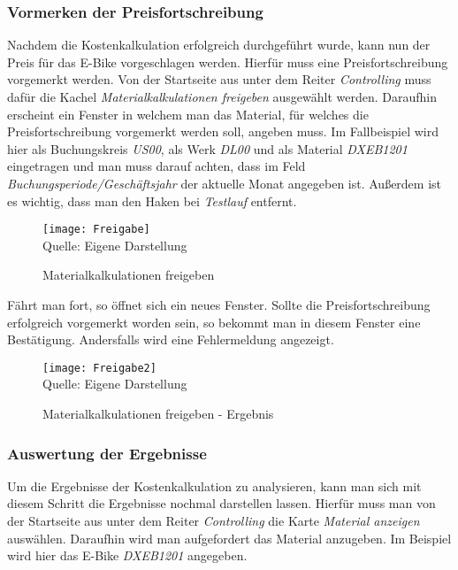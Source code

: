 \subsubsection{Vormerken der Preisfortschreibung}
Nachdem die Kostenkalkulation erfolgreich durchgeführt wurde, kann nun der Preis für das E-Bike vorgeschlagen werden. Hierfür muss eine Preisfortschreibung vorgemerkt werden.
 Von der Startseite aus unter dem Reiter \textit{Controlling} muss dafür die Kachel \textit{Materialkalkulationen freigeben} ausgewählt werden. Daraufhin erscheint ein Fenster in welchem man das Material, für welches die Preisfortschreibung vorgemerkt werden soll, angeben muss.
  Im Fallbeispiel wird hier als Buchungskreis \textit{US00}, als Werk \textit{DL00} und als Material \textit{DXEB1201} eingetragen und man muss darauf achten, dass im Feld \textit{Buchungsperiode/Geschäftsjahr} der aktuelle Monat angegeben ist. Außerdem ist es wichtig, dass man den Haken bei \textit{Testlauf} entfernt.

\begin{figure}[H]
    \caption{Materialkalkulationen freigeben}\label{fig:freigabe}
    \texttt{[image: Freigabe]}
    \\
    Quelle: Eigene Darstellung
\end{figure}

Fährt man fort, so öffnet sich ein neues Fenster. Sollte die Preisfortschreibung erfolgreich vorgemerkt worden sein, so bekommt man in diesem Fenster eine Bestätigung. Andersfalls wird eine Fehlermeldung angezeigt.

\begin{figure}[H]
    \caption{Materialkalkulationen freigeben - Ergebnis}\label{fig:freigabe2}
    \texttt{[image: Freigabe2]}
    \\
    Quelle: Eigene Darstellung
\end{figure}

\subsubsection{Auswertung der Ergebnisse}
Um die Ergebnisse der Kostenkalkulation zu analysieren, kann man sich mit diesem Schritt die Ergebnisse nochmal darstellen lassen. Hierfür muss man von der Startseite aus unter 
dem Reiter \textit{Controlling} die Karte \textit{Material anzeigen} auswählen. Daraufhin wird man aufgefordert das Material anzugeben. Im Beispiel wird hier das E-Bike \textit{DXEB1201} angegeben.

